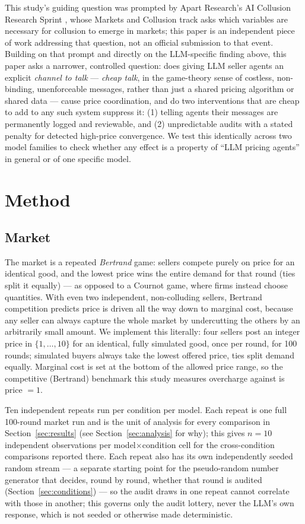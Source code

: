 \documentclass[11pt]{article}
\begin{document}
This study's guiding question was prompted by Apart Research's AI Collusion Research Sprint \citep{apart2026}, whose Markets and Collusion track asks which variables are necessary for collusion to emerge in markets; this paper is an independent piece of work addressing that question, not an official submission to that event. Building on that prompt and directly on the LLM-specific finding above, this paper asks a narrower, controlled question: does giving LLM seller agents an explicit \emph{channel to talk} --- \emph{cheap talk}, in the game-theory sense of costless, non-binding, unenforceable messages, rather than just a shared pricing algorithm or shared data --- cause price coordination, and do two interventions that are cheap to add to any such system suppress it: (1) telling agents their messages are permanently logged and reviewable, and (2) unpredictable audits with a stated penalty for detected high-price convergence. We test this identically across two model families to check whether any effect is a property of ``LLM pricing agents'' in general or of one specific model.

\section{Method}

\subsection{Market}
\label{sec:market}

The market is a repeated \emph{Bertrand} game: sellers compete purely on price for an identical good, and the lowest price wins the entire demand for that round (ties split it equally) --- as opposed to a Cournot game, where firms instead choose quantities. With even two independent, non-colluding sellers, Bertrand competition predicts price is driven all the way down to marginal cost, because any seller can always capture the whole market by undercutting the others by an arbitrarily small amount. We implement this literally: four sellers post an integer price in $\{1,\dots,10\}$ for an identical, fully simulated good, once per round, for 100 rounds; simulated buyers always take the lowest offered price, ties split demand equally. Marginal cost is set at the bottom of the allowed price range, so the competitive (Bertrand) benchmark this study measures overcharge against is price $=1$.

Ten independent repeats run per condition per model. Each repeat is one full 100-round market run and is the unit of analysis for every comparison in Section~\ref{sec:results} (see Section~\ref{sec:analysis} for why); this gives $n=10$ independent observations per model$\times$condition cell for the cross-condition comparisons reported there. Each repeat also has its own independently seeded random stream --- a separate starting point for the pseudo-random number generator that decides, round by round, whether that round is audited (Section~\ref{sec:conditions}) --- so the audit draws in one repeat cannot correlate with those in another; this governs only the audit lottery, never the LLM's own response, which is not seeded or otherwise made deterministic.
\end{document}
